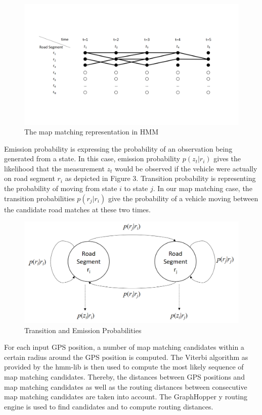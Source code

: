 \documentclass[a4paper]{article}
\begin{document}
\begin{figure}
\centering
\includegraphics[width=1.0\textwidth]{fig2.png}
\caption{\label{fig:data} The map matching representation in HMM}
\end{figure}

Emission probability is expressing the probability of an observation being generated from a state. In this case, emission probability $p(z_t|r_i)$ gives the likelihood that the measurement $z_t$ would be observed if the vehicle were actually on road segment $r_i$ as depicted in Figure 3. Transition probability is representing the probability of moving from state $i$ to state $j$. In our map matching case, the transition probabilities $p(r_j|r_i)$ give the probability of a vehicle moving between the candidate road matches at these two times. 

\begin{figure}
\centering
\includegraphics[width=1.0\textwidth]{fig3.png}
\caption{\label{fig:data} Transition and Emission Probabilities}
\end{figure}

For each input GPS position, a number of map matching candidates within a certain radius around the GPS position is computed. The Viterbi algorithm as provided by the hmm-lib is then used to compute the most likely sequence of map matching candidates. Thereby, the distances between GPS positions and map matching candidates as well as the routing distances between consecutive map matching candidates are taken into account. The GraphHopper y routing engine is used to find candidates and to compute routing distances.
\end{document}
